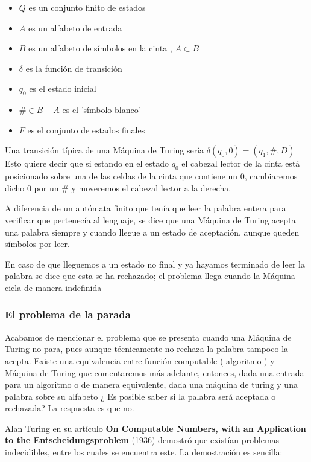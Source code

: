 \begin{multicols}{2}
	\begin{itemize}
		\item $Q$ es un conjunto finito de estados
		\item $A$ es un alfabeto de entrada
		\item $B$ es un alfabeto de símbolos en la cinta , $A\subset B$
		\item $\delta$ es la función de transición
		\item $q_0$ es el estado inicial
		\item $\# \in B-A$ es el 'símbolo blanco'	
		\item $F$ es el conjunto de estados finales 
	\end{itemize}
\end{multicols} 
 
 
 Una transición típica de una Máquina de Turing sería $\delta(q_0,0)=(q_1,\#,D)$ Esto quiere decir que si estando en el estado $q_0$ el cabezal lector de la cinta está posicionado sobre una de las celdas de la cinta que contiene un 0, cambiaremos dicho 0 por un $\#$ y moveremos el cabezal lector a la derecha.
 
 A diferencia de un autómata finito que tenía que leer la palabra entera para verificar que pertenecía al lenguaje, se dice que una Máquina de Turing acepta una palabra siempre y cuando llegue a un estado de aceptación, aunque queden símbolos por leer.
 
 En caso de que lleguemos a un estado no final y ya hayamos terminado de leer la palabra se dice que esta se ha rechazado; el problema llega cuando la Máquina cicla de manera indefinida


\subsubsection{El problema de la parada}


Acabamos de mencionar el problema que se presenta cuando una Máquina de Turing no para, pues aunque técnicamente no rechaza la palabra tampoco la acepta. Existe una equivalencia entre función computable ( algoritmo ) y Máquina de Turing que comentaremos más adelante, entonces, dada una entrada para un algoritmo o de manera equivalente, dada una máquina de turing y una palabra sobre su alfabeto ¿ Es posible saber si la palabra será aceptada o rechazada? La respuesta es que no.

Alan Turing en su artículo \textbf{On Computable Numbers, with an Application to the Entscheidungsproblem} (1936) demostró que existían problemas indecidibles, entre los cuales se encuentra este. La demostración es sencilla:

